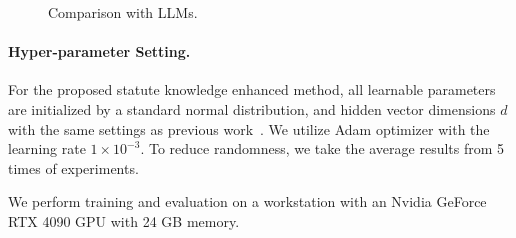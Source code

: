 \begin{figure}
\vfill
\hspace{0.001\linewidth}
\hspace{0.001\linewidth}
\hspace{0.001\linewidth}
    \vspace{-1em}
\caption{Comparison with LLMs. 
}
\label{fig:gpt}
\end{figure}

\paragraph{Hyper-parameter Setting.}

For the proposed statute knowledge enhanced method, all learnable parameters are initialized by a standard normal distribution, and hidden vector dimensions $d$ with the same settings as previous work~\cite{neurjudge}. We utilize Adam optimizer with the learning rate $1\times 10^{-3}$. To reduce randomness, we take the average results from 5 times of experiments. 

We perform training and evaluation on a workstation with an Nvidia GeForce RTX 4090 GPU with 24 GB memory. 



